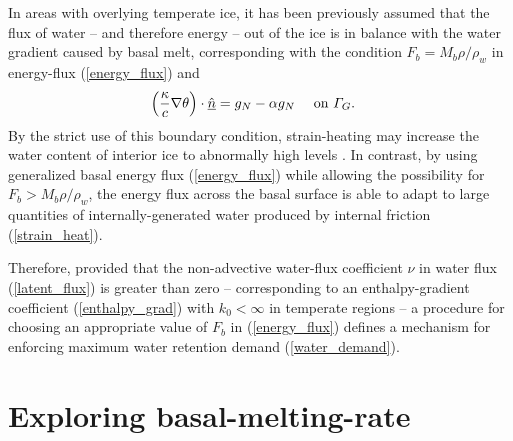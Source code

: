 In areas with overlying temperate ice, it has been previously assumed \citep{aschwanden_2012, kleiner_2015} that the flux of water -- and therefore energy -- out of the ice is in balance with the water gradient caused by basal melt, corresponding with the condition $F_b=M_b \rho / \rho_w$ in energy-flux (\ref{energy_flux}) and
\begin{align}
  \label{zero_basal_water_discharge}
  \left( \frac{\kappa}{c} \nabla \theta \right) \cdot \underline{\hat{n}} &= g_N - \alpha g_N &&\text{ on } \varGamma_G.
\end{align}
By the strict use of this boundary condition, strain-heating may increase the water content of interior ice to abnormally high levels \citep{aschwanden_2012}.  In contrast, by using generalized basal energy flux (\ref{energy_flux}) while allowing the possibility for $F_b > M_b \rho / \rho_w$, the energy flux across the basal surface is able to adapt to large quantities of internally-generated water produced by internal friction (\ref{strain_heat}).

Therefore, provided that the non-advective water-flux coefficient $\nu$ in water flux (\ref{latent_flux}) is greater than zero -- corresponding to an enthalpy-gradient coefficient (\ref{enthalpy_grad}) with $k_0 < \infty$ in temperate regions -- a procedure for choosing an appropriate value of $F_b$ in (\ref{energy_flux}) defines a mechanism for enforcing maximum water retention demand (\ref{water_demand}).



\section{Exploring basal-melting-rate}

